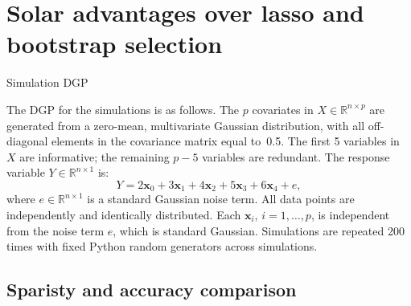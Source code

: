 \documentclass{beamer}
\begin{document}

\section{Solar advantages over lasso and bootstrap selection}

\begin{frame}{Simulation DGP}
  
  The DGP for the simulations is as follows. The $p$ covariates in $X \in \mathbb{R}^{n \times p}$ are generated from a zero-mean, multivariate Gaussian distribution, with all off-diagonal elements in the covariance matrix equal to~0.5. The first 5 variables in $X$ are informative; the remaining $p-5$ variables are redundant. The response variable $Y \in \mathbb{R}^{n \times 1}$ is:
  \begin{equation}
    Y =  2 \mathbf{x}_0 + 3 \mathbf{x}_1 + 4 \mathbf{x}_2 + 5 \mathbf{x}_3 + 6 \mathbf{x}_4  + e,
    \label{eqn:pop_model}
  \end{equation}
  where $e\in \mathbb{R}^{n \times 1}$ is a standard Gaussian noise term. All data points are independently and identically distributed. Each $\mathbf{x}_i$, $i=1,\ldots,p$, is independent from the noise term $e$, which is standard Gaussian. Simulations are repeated 200 times with fixed Python random generators across simulations.

\end{frame}

\subsection{Sparisty and accuracy comparison}
\end{document}
